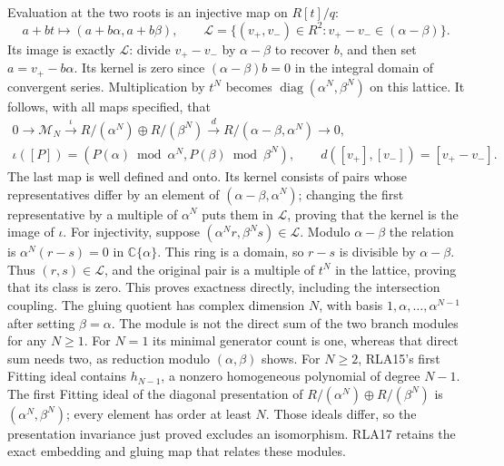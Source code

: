 \documentclass[11pt]{article}
\begin{document}
Evaluation at the two roots is an injective map on $R[t]/q$:
\[
 a+bt\longmapsto(a+b\alpha,a+b\beta),\qquad
 \mathcal L=\{(v_+,v_-)\in R^2:
                      v_+-v_-\in(\alpha-\beta)\}.
 \tag{RLA16}
\]
Its image is exactly $\mathcal L$: divide $v_+-v_-$ by
$\alpha-\beta$ to recover $b$, and then set $a=v_+-b\alpha$.
Its kernel is zero since $(\alpha-\beta)b=0$ in the integral
domain of convergent series.  Multiplication by $t^N$ becomes
$\operatorname{diag}(\alpha^N,\beta^N)$ on this lattice.
It follows, with all maps specified, that
\[
\begin{gathered}
 0\longrightarrow\mathcal M_N
 \xrightarrow{\,\iota\,}R/(\alpha^N)\oplus R/(\beta^N)
 \xrightarrow{\,d\,}R/(\alpha-\beta,\alpha^N)
 \longrightarrow0,\\
 \iota([P])=(P(\alpha)\bmod\alpha^N,
                         P(\beta)\bmod\beta^N),\qquad
 d([v_+],[v_-])=[v_+-v_-].
\end{gathered}\tag{RLA17}
\]
The last map is well defined and onto.  Its kernel consists of
pairs whose representatives differ by an element of
$(\alpha-\beta,\alpha^N)$; changing the first representative by
a multiple of $\alpha^N$ puts them in $\mathcal L$, proving that
the kernel is the image of $\iota$.
For injectivity, suppose $(\alpha^Nr,\beta^Ns)\in\mathcal L$.
Modulo $\alpha-\beta$ the relation is
$\alpha^N(r-s)=0$ in $\mathbb C\{\alpha\}$.
This ring is a domain, so $r-s$ is divisible by $\alpha-\beta$.
Thus $(r,s)\in\mathcal L$, and the original pair is a multiple of
$t^N$ in the lattice, proving that its class is zero.
This proves exactness directly, including the intersection coupling.
The gluing quotient has complex dimension $N$, with basis
$1,\alpha,\ldots,\alpha^{N-1}$ after setting $\beta=\alpha$.
The module is not the direct sum of the two branch modules for
any $N\ge1$.  For $N=1$ its minimal generator count is one,
whereas that direct sum needs two, as reduction modulo
$(\alpha,\beta)$ shows.  For $N\ge2$, RLA15's first Fitting
ideal contains $h_{N-1}$, a nonzero homogeneous polynomial of
degree $N-1$.  The first Fitting ideal of the diagonal
presentation of $R/(\alpha^N)\oplus R/(\beta^N)$ is
$(\alpha^N,\beta^N)$; every element has order at least $N$.
Those ideals differ, so the presentation invariance just proved
excludes an isomorphism.  RLA17 retains the exact embedding and
gluing map that relates these modules.
\end{document}
